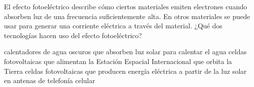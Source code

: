 El efecto fotoeléctrico describe cómo ciertos materiales emiten electrones cuando absorben luz de una frecuencia suficientemente alta. En otros materiales se puede usar para generar una corriente eléctrica a través del material.
¿Qué dos tecnologías hacen uso del efecto fotoeléctrico?

\begin{checkboxes}
    \choice calentadores de agua oscuros que absorben luz solar para calentar el agua
    \CorrectChoice celdas fotovoltaicas que alimentan la Estación Espacial Internacional que orbita la Tierra
    \CorrectChoice celdas fotovoltaicas que producen energía eléctrica a partir de la luz solar en antenas de telefonía celular
\end{checkboxes}